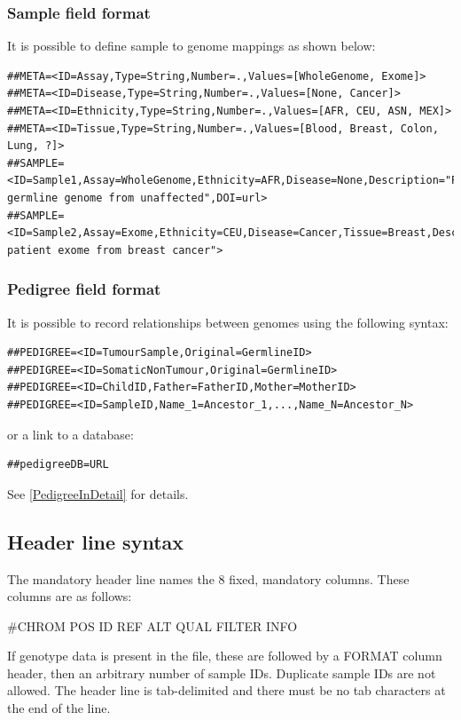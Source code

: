 \documentclass[8pt]{article}
\begin{document}
\subsubsection{Sample field format}
It is possible to define sample to genome mappings as shown below:
{\scriptsize
\begin{verbatim}
##META=<ID=Assay,Type=String,Number=.,Values=[WholeGenome, Exome]>
##META=<ID=Disease,Type=String,Number=.,Values=[None, Cancer]>
##META=<ID=Ethnicity,Type=String,Number=.,Values=[AFR, CEU, ASN, MEX]>
##META=<ID=Tissue,Type=String,Number=.,Values=[Blood, Breast, Colon, Lung, ?]>
##SAMPLE=<ID=Sample1,Assay=WholeGenome,Ethnicity=AFR,Disease=None,Description="Patient germline genome from unaffected",DOI=url>
##SAMPLE=<ID=Sample2,Assay=Exome,Ethnicity=CEU,Disease=Cancer,Tissue=Breast,Description="European patient exome from breast cancer">
\end{verbatim}}

\subsubsection{Pedigree field format}
It is possible to record relationships between genomes using the following syntax:
\begin{verbatim}
##PEDIGREE=<ID=TumourSample,Original=GermlineID>
##PEDIGREE=<ID=SomaticNonTumour,Original=GermlineID>
##PEDIGREE=<ID=ChildID,Father=FatherID,Mother=MotherID>
##PEDIGREE=<ID=SampleID,Name_1=Ancestor_1,...,Name_N=Ancestor_N>
\end{verbatim}
\noindent or a link to a database:
\begin{verbatim}
##pedigreeDB=URL
\end{verbatim}

\noindent See \ref{PedigreeInDetail} for details.


\subsection{Header line syntax}
\label{header-line}
The mandatory header line names the 8 fixed, mandatory columns. These columns are as follows:
\begin{center}
       \#CHROM
\qquad POS
\qquad ID
\qquad REF
\qquad ALT
\qquad QUAL
\qquad FILTER
\qquad INFO
\end{center}
\noindent
If genotype data is present in the file, these are followed by a FORMAT column header, then an arbitrary number of sample IDs.
Duplicate sample IDs are not allowed.
The header line is tab-delimited and there must be no tab characters at the end of the line.
\end{document}
